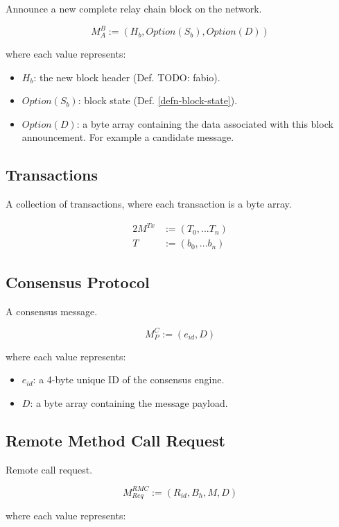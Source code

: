 \documentclass{book}
\newcommand{\todo}[1]{}
\renewcommand{\todo}[1]{{\color{red} TODO: {#1}}}
\begin{document}
Announce a new complete relay chain block on the network.

\[
    M^B_A := (H_b, Option(S_b), Option(D))
\]

where each value represents:

\begin{itemize}
    \item $H_b$: the new block header (Def. \todo{fabio}).
    \item $Option(S_b)$: block state (Def. \ref{defn-block-state}).
    \item $Option(D)$: a byte array containing the data associated with this
    block announcement. For example a candidate message.
\end{itemize}

\subsection{Transactions}

A collection of transactions, where each transaction is a byte array.

\begin{alignat*}{2}
    M^{Tx} &:= (T_0, ... T_n) \\
    T &:= (b_0, ... b_n)
\end{alignat*}

\subsection{Consensus Protocol}

A consensus message.

\[
    M^C_P := (e_{id}, D)
\]

where each value represents:

\begin{itemize}
    \item $e_{id}$: a 4-byte unique ID of the consensus engine.
    \item $D$: a byte array containing the message payload.
\end{itemize}

\subsection{Remote Method Call Request}

Remote call request.

\[
    M^{RMC}_{Req} := (R_{id}, B_h, M, D)
\]

where each value represents:
\end{document}
